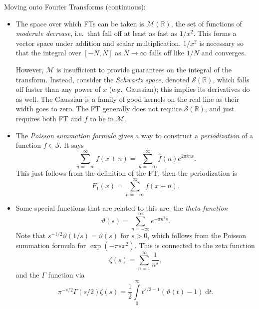 \documentclass[11pt,
        usenames, %
        dvipsnames %
    ]{report}
\newcommand*{\p}[1]{\left(#1\right)}
\newcommand*{\s}[1]{\left[#1\right]}
\begin{document}
Moving onto Fourier Transforms (continuous):
\begin{itemize}
    \item The space over which FTs can be taken is $\mathcal{M}(\mathbb{R})$,
        the set of functions of \emph{moderate decrease}, i.e.\ that fall off
        at least as fast as $1/x^2$. This forms a vector space under addition
        and scalar multiplication. $1/x^2$ is necessary so that the integral
        over $\s{-N, N}$ as $N \to \infty$ falls off like $1/N$ and converges.

        However, $\mathcal{M}$ is insufficient to provide guarantees on the
        integral of the transform. Instead, consider the \emph{Schwartz space},
        denoted $\mathcal{S}(\mathbb{R})$, which falls off faster than any
        power of $x$ (e.g.\ Gaussian); this implies its derivatives do as well.
        The Gaussian is a family of good kernels on the real line as their width
        goes to zero. The FT generally does not require
        $\mathcal{S}(\mathbb{R})$, and just requires both FT and $f$ to be in
        $\mathcal{M}$.

    \item The \emph{Poisson summation formula} gives a way to construct a
        \emph{periodization} of a function $f \in \mathcal{S}$. It says
        \begin{equation}
            \sum\limits_{n = -\infty}^\infty f(x + n)
                = \sum\limits_{n = -\infty}^\infty \hat{f}(n) e^{2\pi inx}.
        \end{equation}
        This just follows from the definition of the FT, then the periodization
        is
        \begin{equation}
            F_1(x) = \sum\limits_{n = -\infty}^\infty f(x + n).
        \end{equation}

    \item Some special functions that are related to this are: the \emph{theta
        function}
        \begin{equation}
            \vartheta(s) = \sum\limits_{n = -\infty}^\infty e^{-\pi n^2s}.
        \end{equation}
        Note that $s^{-1/2}\vartheta(1/s) = \vartheta(s)$ for $s > 0$, which
        follows from the Poisson summation formula for $\exp(-\pi sx^2)$. This
        is connected to the zeta function
        \begin{equation}
            \zeta(s) = \sum\limits_{n=1}^\infty \frac{1}{n^s},
        \end{equation}
        and the $\Gamma$ function via
        \begin{equation}
            \pi^{-s/2}\Gamma\p{s/2}\zeta(s)
                = \frac{1}{2}\int\limits_{0}^\infty t^{s/2 - 1}
                    \p{\vartheta(t) - 1}\;\mathrm{d}t.
        \end{equation}


\end{itemize}
\end{document}
